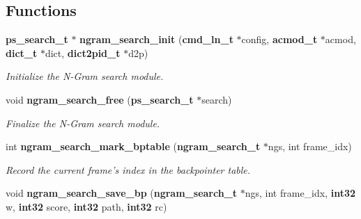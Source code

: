 \subsection*{\-Functions}
\begin{DoxyCompactItemize}
\item 
{\bf ps\-\_\-search\-\_\-t} $\ast$ {\bf ngram\-\_\-search\-\_\-init} ({\bf cmd\-\_\-ln\-\_\-t} $\ast$config, {\bf acmod\-\_\-t} $\ast$acmod, {\bf dict\-\_\-t} $\ast$dict, {\bf dict2pid\-\_\-t} $\ast$d2p)\label{ngram__search_8c_afa0dcbb86340083bce1412c9309742bc}

\begin{DoxyCompactList}\small\item\em \-Initialize the \-N-\/\-Gram search module. \end{DoxyCompactList}\item 
void {\bf ngram\-\_\-search\-\_\-free} ({\bf ps\-\_\-search\-\_\-t} $\ast$search)\label{ngram__search_8c_aeaf140dc2bbeaa5c274f73480b5328f3}

\begin{DoxyCompactList}\small\item\em \-Finalize the \-N-\/\-Gram search module. \end{DoxyCompactList}\item 
int {\bf ngram\-\_\-search\-\_\-mark\-\_\-bptable} ({\bf ngram\-\_\-search\-\_\-t} $\ast$ngs, int frame\-\_\-idx)
\begin{DoxyCompactList}\small\item\em \-Record the current frame's index in the backpointer table. \end{DoxyCompactList}\item 
void {\bf ngram\-\_\-search\-\_\-save\-\_\-bp} ({\bf ngram\-\_\-search\-\_\-t} $\ast$ngs, int frame\-\_\-idx, {\bf int32} w, {\bf int32} score, {\bf int32} path, {\bf int32} rc)\label{ngram__search_8c_ae36649be6f5a2190e759e7ed13bd7b6b}


\end{DoxyCompactItemize}
